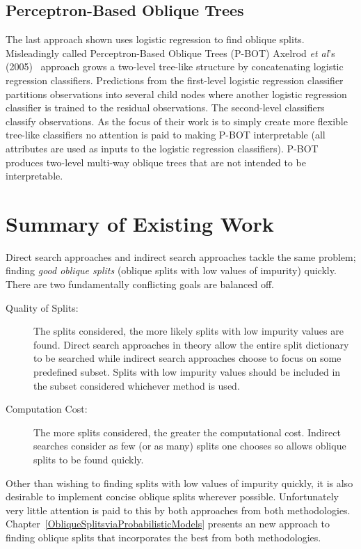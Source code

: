 \subsection{Perceptron-Based Oblique Trees}
\label{PerceptronBasedObliqueTrees}
The last approach shown uses logistic regression to find oblique splits. Misleadingly called Perceptron-Based Oblique Trees (P-BOT) Axelrod \emph{et al}'s (2005)~\cite{axelrod05} approach grows a two-level tree-like structure by concatenating logistic regression classifiers. Predictions from the first-level logistic regression classifier partitions observations into several child nodes where another logistic regression classifier is trained to the residual observations. The second-level classifiers classify observations. As the focus of their work is to simply create more flexible tree-like classifiers no attention is paid to making P-BOT interpretable (all attributes are used as inputs to the logistic regression classifiers). P-BOT produces two-level multi-way oblique trees that are not intended to be interpretable. 

\section{Summary of Existing Work}
\label{SummaryofExistingWork}
Direct search approaches and indirect search approaches tackle the same problem; finding \emph{good oblique splits} (oblique splits with low values of impurity) quickly. There are two fundamentally conflicting goals are balanced off.
\begin{description}
\item[Quality of Splits:] The splits considered, the more likely splits with low impurity values are found. Direct search approaches in theory allow the entire split dictionary to be searched while indirect search approaches choose to focus on some predefined subset. Splits with low impurity values should be included in the subset considered whichever method is used.
\item[Computation Cost:] The more splits considered, the greater the computational cost. Indirect searches consider as few (or as many) splits one chooses so allows oblique splits to be found quickly. 
\end{description}
Other than wishing to finding splits with low values of impurity quickly, it is also desirable to implement concise oblique splits wherever possible. Unfortunately very little attention is paid to this by both approaches from both methodologies. Chapter~\ref{ObliqueSplitsviaProbabilisticModels} presents an new approach to finding oblique splits that incorporates the best from both methodologies.
